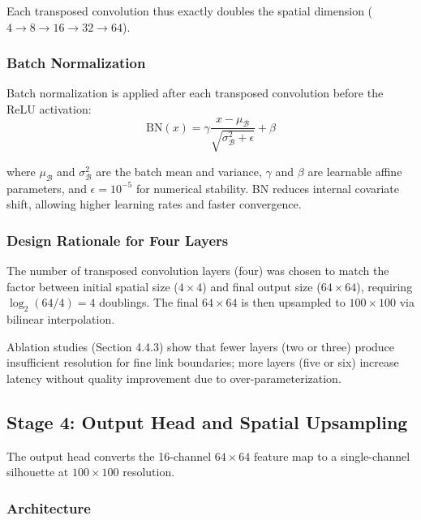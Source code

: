 ﻿\documentclass[12pt,a4paper,oneside]{report}
\begin{document}
Each transposed convolution thus exactly doubles the spatial dimension ($4 \rightarrow 8 \rightarrow 16 \rightarrow 32 \rightarrow 64$).

\subsubsection{Batch Normalization}

Batch normalization is applied after each transposed convolution before the ReLU activation:
\begin{equation}
\text{BN}(x) = \gamma \frac{x - \mu_{\mathcal{B}}}{\sqrt{\sigma_{\mathcal{B}}^2 + \epsilon}} + \beta
\end{equation}

where $\mu_{\mathcal{B}}$ and $\sigma_{\mathcal{B}}^2$ are the batch mean and variance, $\gamma$ and $\beta$ are learnable affine parameters, and $\epsilon = 10^{-5}$ for numerical stability. BN reduces internal covariate shift, allowing higher learning rates and faster convergence.

\subsubsection{Design Rationale for Four Layers}

The number of transposed convolution layers (four) was chosen to match the factor between initial spatial size ($4 \times 4$) and final output size ($64 \times 64$), requiring $\log_2(64/4) = 4$ doublings. The final $64 \times 64$ is then upsampled to $100 \times 100$ via bilinear interpolation.

Ablation studies (Section 4.4.3) show that fewer layers (two or three) produce insufficient resolution for fine link boundaries; more layers (five or six) increase latency without quality improvement due to over-parameterization.

\subsection{Stage 4: Output Head and Spatial Upsampling}

The output head converts the 16-channel $64 \times 64$ feature map to a single-channel silhouette at $100 \times 100$ resolution.

\subsubsection{Architecture}
\end{document}
